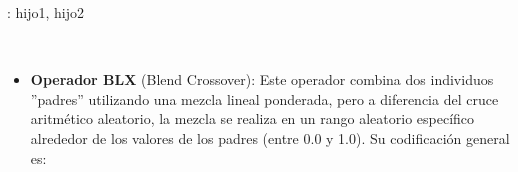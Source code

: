 \begin{algorithm}[H]
	
	
	\BlankLine
	:
	\BlankLine
	\BlankLine
	\Return hijo1, hijo2\;
\end{algorithm}
\quad\\
\begin{itemize}
	\item \textbf{Operador BLX} (Blend Crossover): Este operador combina dos individuos ''padres'' utilizando una mezcla lineal ponderada, pero a diferencia del cruce aritmético aleatorio, la mezcla se realiza en un rango aleatorio específico alrededor de los valores de los padres (entre 0.0 y 1.0). Su codificación general es:
\end{itemize}

